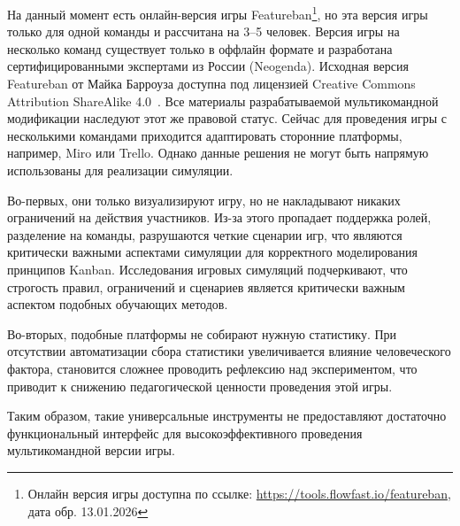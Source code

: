На данный момент есть онлайн-версия игры Featureban\footnote{Онлайн версия игры доступна по ссылке: \url{https://tools.flowfast.io/featureban}, дата обр. 13.01.2026}, но эта версия игры только для одной команды и рассчитана на 3–5 человек. Версия игры на несколько команд существует только в оффлайн формате и разработана сертифицированными экспертами из России (Neogenda)\cite{multi-featureban}. Исходная версия Featureban от Майка Барроуза доступна под лицензией Creative Commons Attribution ShareAlike 4.0~\cite{license-cc}. Все материалы разрабатываемой мультикомандной модификации наследуют этот же правовой статус. Сейчас для проведения игры с несколькими командами приходится адаптировать сторонние платформы, например, Miro или Trello. Однако данные решения не могут быть напрямую использованы для реализации симуляции. 

Во-первых, они только визуализируют игру, но не накладывают никаких ограничений на действия участников. Из-за этого пропадает поддержка ролей, разделение на команды, разрушаются четкие сценарии игр, что являются критически важными аспектами симуляции для корректного моделирования принципов Kanban. Исследования игровых симуляций подчеркивают, что строгость правил, ограничений и сценариев является критически важным аспектом подобных обучающих методов. 

Во-вторых, подобные платформы не собирают нужную статистику. При отсутствии автоматизации сбора статистики увеличивается влияние человеческого фактора, становится сложнее проводить рефлексию над экспериментом, что приводит к снижению педагогической ценности проведения этой игры. 

Таким образом, такие универсальные инструменты не предоставляют достаточно функциональный интерфейс для высокоэффективного проведения мультикомандной версии игры.
